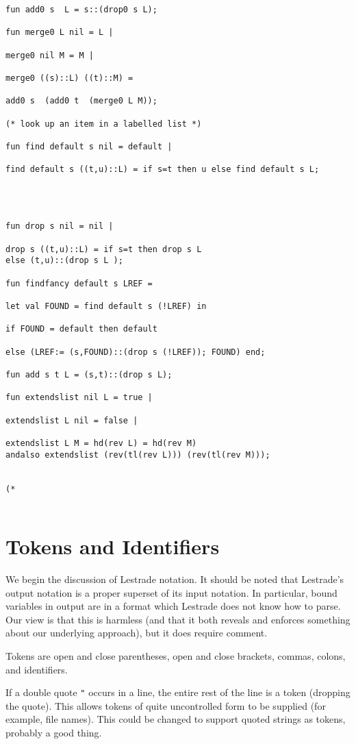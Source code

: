 \documentclass[12pt]{article}
\begin{document}
\begin{verbatim}
fun add0 s  L = s::(drop0 s L);

fun merge0 L nil = L |

merge0 nil M = M |

merge0 ((s)::L) ((t)::M) =

add0 s  (add0 t  (merge0 L M));

(* look up an item in a labelled list *)

fun find default s nil = default |

find default s ((t,u)::L) = if s=t then u else find default s L;




fun drop s nil = nil |

drop s ((t,u)::L) = if s=t then drop s L 
else (t,u)::(drop s L );

fun findfancy default s LREF =

let val FOUND = find default s (!LREF) in

if FOUND = default then default

else (LREF:= (s,FOUND)::(drop s (!LREF)); FOUND) end;

fun add s t L = (s,t)::(drop s L);

fun extendslist nil L = true |

extendslist L nil = false |

extendslist L M = hd(rev L) = hd(rev M)
andalso extendslist (rev(tl(rev L))) (rev(tl(rev M)));


(*


\end{verbatim}

\newpage


\section{Tokens and Identifiers}

We begin the discussion of Lestrade notation.  It should be noted that Lestrade's output notation is a proper superset of its input notation.  In particular, bound variables in output are in a format which Lestrade does not know how to parse.  Our view is that this is harmless (and that it both reveals and enforces something about our underlying approach), but it does require comment.

Tokens are open and close parentheses, open and close brackets, commas, colons,  and identifiers.

If a double quote \verb|"| occurs in a line, the entire rest of the line is a token (dropping the quote).  This allows tokens of
quite uncontrolled form to be supplied (for example, file names).  This could be changed to support quoted strings as tokens, probably a good thing.
\end{document}
